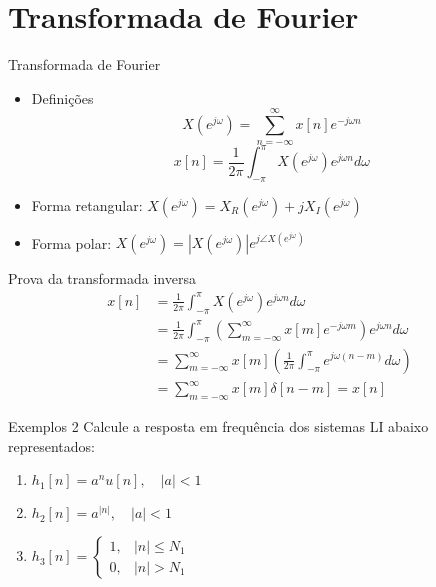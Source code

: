 \documentclass[
size=17pt,
paper=smartboard,
mode=present,
display=slidesnotes,
style=sailor,
nopagebreaks,
blackslide,
fleqn]{powerdot}
\begin{document}
\section[slide=true]{Transformada de Fourier}
\begin{slide}[toc=]{Transformada de Fourier}
 \begin{itemize}
  \item Defini\c c\~oes
     \begin{equation*} X(e^{j\omega})=\sum_{n=-\infty}^{\infty} x[n]e^{-j\omega n}  \end{equation*}
     \begin{equation*} x[n]=\frac{1}{2\pi}\int_{-\pi}^{\pi} X(e^{j\omega})e^{j\omega n} d\omega \end{equation*}
   \item Forma retangular: $X(e^{j\omega}) = X_R(e^{j\omega}) + j X_I(e^{j\omega})$
   \item Forma polar: $X(e^{j\omega}) = |X(e^{j\omega})|e^{j\angle X(e^{j\omega})}$
 \end{itemize}
\end{slide}

\begin{slide}[toc=]{Prova da transformada inversa}
      \begin{align*} x[n]&= \frac{1}{2\pi}\int_{-\pi}^{\pi} X(e^{j\omega})e^{j\omega n} d\omega\\
                       &= \frac{1}{2\pi}\int_{-\pi}^{\pi} \left ( \sum_{m=-\infty}^{\infty} x[m]e^{-j\omega m}\right )e^{j\omega n} d\omega\\
                       & = \sum_{m=-\infty}^{\infty}x[m]\left ( \frac{1}{2\pi} \int_{-\pi}^{\pi} e^{j\omega(n-m)}d\omega \right ) \\   
                       & = \sum_{m=-\infty}^{\infty}x[m] \delta[n-m] = x[n]\end{align*}
\end{slide}

\begin{slide}[toc=]{Exemplos 2}
Calcule a resposta em frequência dos sistemas LI abaixo representados:
\begin{enumerate}
   \item $h_1[n] = a^nu[n], \quad |a|<1$
   \item $h_2[n] = a^{|n|}, \quad |a|<1$
   \item $h_3[n] = \begin{cases} 1,& |n|\leq N_1\\0,&|n|> N_1\end{cases}$
\end{enumerate}
\end{slide}
\end{document}
